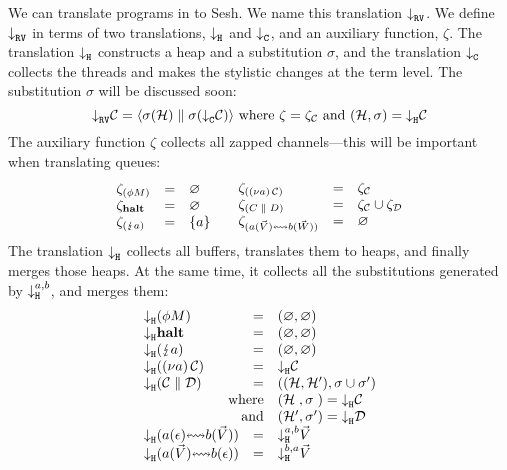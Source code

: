 \documentclass[acmsmall,review,anonymous]{acmart}
\begin{document}
We can translate programs in \affineAGV to Sesh. We name this translation $\mtr{}$. We define $\mtr{}$ in terms of two translations, $\mtrh{}$ and $\mtrc{}$, and an auxiliary function, $\zeta$. The translation $\mtrh{}$ constructs a heap and a substitution $\sigma$, and the translation $\mtrc{}$ collects the threads and makes the stylistic changes at the term level. The substitution $\sigma$ will be discussed soon:
\[
  \mtr{\gvConf{C}} = \rvRedTup[\sigma(\mtrc{\gvConf{C}})]{\sigma(\rvHeap{H})}{}
  \text{ where }\zeta=\zeta_{\gvConf{C}}\text{ and }(\rvHeap{H},\sigma)=\mtrh{\gvConf{C}}
\]
The auxiliary function $\zeta$ collects all zapped channels---this will be important when translating queues:
\[
  \begin{array}{lcl}
    \zeta_{\parens{\gvThread{\phi}{M}}}
    & = & \varnothing
    \\
    \zeta_{\gvHalt}
    & = & \varnothing
    \\
    \zeta_{\parens{\gvZap{a}}}
    & = & \{a\}
  \end{array}
  \quad
  \begin{array}{lcl}
    \zeta_{\parens{\gvRes{a}{\gvConf{C}}}}
    & = & \zeta_{\gvConf{C}}
    \\
    \zeta_{\parens{\gvPar{C}{D}}}
    & = & \zeta_{\gvConf{C}} \cup \zeta_{\gvConf{D}}
    \\
    \zeta_{\parens{\gvBuf{a}{\gvVec{V}}{b}{\gvVec{W}}}}
    & = & \varnothing
  \end{array}
\]
The translation $\mtrh{}$ collects all buffers, translates them to heaps, and finally merges those heaps. At the same time, it collects all the substitutions generated by $\mtrh[a,b]{}$, and merges them:
\[
  \begin{array}{c}
    \begin{array}{lcl}
      \mtrh{\parens{\gvThread{\phi}{M}}}
      & = & (\varnothing, \varnothing)
      \\
      \mtrh{\gvHalt}
      & = & (\varnothing, \varnothing)
      \\
      \mtrh{\parens{\gvZap{a}}}
      & = & (\varnothing, \varnothing)
      \\
      \mtrh{\parens{\gvRes{a}{\gvConf{C}}}}
      & = & \mtrh{\gvConf{C}}
      \\
      \mtrh{\parens{\gvPar{\gvConf{C}}{\gvConf{D}}}}
      & = & ((\rvHeap{H}\st{,}\,\rvHeap{H'}), \sigma \cup \sigma')
      \\
      \multicolumn{2}{r}{\text{where}}
      & (\rvHeap{H}\hphantom{'}, \sigma\hphantom{'}) = \mtrh{\gvConf{C}}
      \\
      \multicolumn{2}{r}{\text{and}}
      & (\rvHeap{H}', \sigma') = \mtrh{\gvConf{D}}
      \\
      \mtrh{\parens{\gvBuf{a}{\gvVecEmp}{b}{\gvVec{V}}}}
      & = & \mtrh[a,b]{\gvVec{V}}
      \\
      \mtrh{\parens{\gvBuf{a}{\gvVec{V}}{b}{\gvVecEmp}}}
      & = & \mtrh[b,a]{\gvVec{V}}
    \end{array}
  \end{array}
\]
\end{document}
